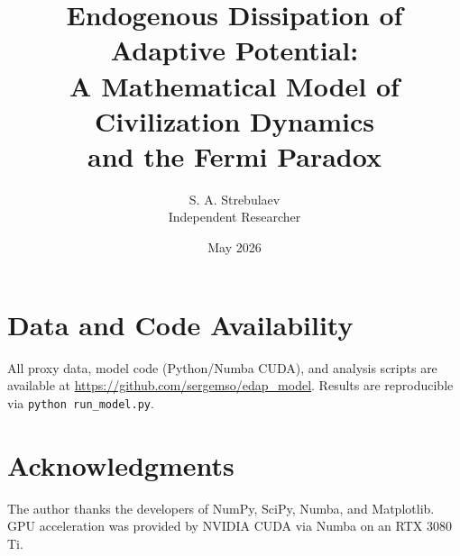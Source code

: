 \documentclass[12pt,a4paper]{article}
\title{Endogenous Dissipation of Adaptive Potential:\\
A Mathematical Model of Civilization Dynamics\\
and the Fermi Paradox}
\author{S. A. Strebulaev\\
Independent Researcher}
\date{May 2026}
\begin{document}
\maketitle








\section*{Data and Code Availability}
All proxy data, model code (Python/Numba CUDA), and analysis scripts are available at \url{https://github.com/sergemso/edap_model}. Results are reproducible via \texttt{python run\_model.py}.

\section*{Acknowledgments}
The author thanks the developers of NumPy, SciPy, Numba, and Matplotlib. GPU acceleration was provided by NVIDIA CUDA via Numba on an RTX 3080 Ti.



\end{document}
